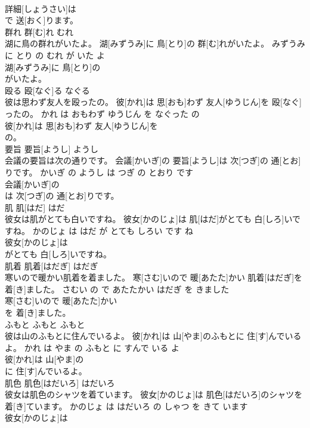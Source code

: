 \documentclass[8pt]{extreport}
\begin{document}
\begin{CJK}{UTF8}{min}
\\	詳細[しょうさい]は
\\	で 送[おく]ります。			
\\	群れ	群[む]れ	むれ	
\\	湖に鳥の群れがいたよ。	湖[みずうみ]に 鳥[とり]の 群[む]れがいたよ。	みずうみ に とり の むれ が いた よ	
\\	湖[みずうみ]に 鳥[とり]の
\\	がいたよ。			
\\	殴る	殴[なぐ]る	なぐる	
\\	彼は思わず友人を殴ったの。	彼[かれ]は 思[おも]わず 友人[ゆうじん]を 殴[なぐ]ったの。	かれ は おもわず ゆうじん を なぐった の	
\\	彼[かれ]は 思[おも]わず 友人[ゆうじん]を
\\	の。			
\\	要旨	要旨[ようし]	ようし	
\\	会議の要旨は次の通りです。	会議[かいぎ]の 要旨[ようし]は 次[つぎ]の 通[とお]りです。	かいぎ の ようし は つぎ の とおり です	
\\	会議[かいぎ]の
\\	は 次[つぎ]の 通[とお]りです。			
\\	肌	肌[はだ]	はだ	
\\	彼女は肌がとても白いですね。	彼女[かのじょ]は 肌[はだ]がとても 白[しろ]いですね。	かのじょ は はだ が とても しろい です ね	
\\	彼女[かのじょ]は
\\	がとても 白[しろ]いですね。			
\\	肌着	肌着[はだぎ]	はだぎ	
\\	寒いので暖かい肌着を着ました。	寒[さむ]いので 暖[あたた]かい 肌着[はだぎ]を 着[き]ました。	さむい の で あたたかい はだぎ を きました	
\\	寒[さむ]いので 暖[あたた]かい
\\	を 着[き]ました。			
\\	ふもと	ふもと	ふもと	
\\	彼は山のふもとに住んでいるよ。	彼[かれ]は 山[やま]のふもとに 住[す]んでいるよ。	かれ は やま の ふもと に すんで いる よ	
\\	彼[かれ]は 山[やま]の
\\	に 住[す]んでいるよ。			
\\	肌色	肌色[はだいろ]	はだいろ	
\\	彼女は肌色のシャツを着ています。	彼女[かのじょ]は 肌色[はだいろ]のシャツを 着[き]ています。	かのじょ は はだいろ の しゃつ を きて います	
\\	彼女[かのじょ]は

\end{CJK}
\end{document}

